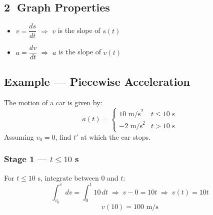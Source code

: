 \documentclass{wilson-summary}
\begin{document}
\subsection*{\textcircled{\small 2}\; Graph Properties}
\begin{center}
\end{center}

\begin{itemize}[nosep]
  \item $v = \dfrac{ds}{dt}$ \quad $\Rightarrow$ \quad $v$ is the slope of $s(t)$
  \item $a = \dfrac{dv}{dt}$ \quad $\Rightarrow$ \quad $a$ is the slope of $v(t)$
\end{itemize}

\subsection*{Example — Piecewise Acceleration}

The motion of a car is given by:
\[
  a(t) = \begin{cases}
    10\text{ m/s}^2 & t \leq 10\text{ s} \\
   -2\text{ m/s}^2  & t > 10\text{ s}
  \end{cases}
\]
Assuming $v_0 = 0$, find $t'$ at which the car stops.

\subsubsection*{Stage 1 — $t \leq 10$ s}
For $t \le 10$ s, integrate between $0$ and $t$:
\[
  \int_{v_0}^{v} dv = \int_0^t 10\,dt
  \;\Rightarrow\;
  v - 0 = 10t
  \;\Rightarrow\;
  v(t) = 10t
\]
\[
  v(10) = 100\text{ m/s}
\]
\end{document}
